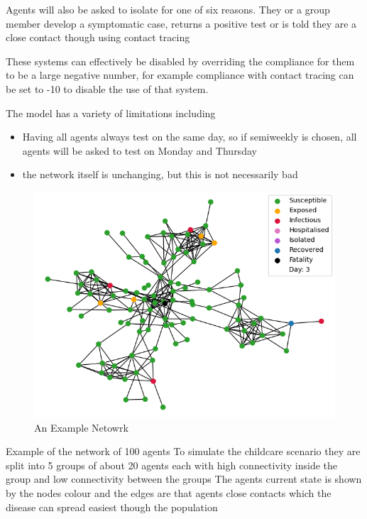 \documentclass{article}
\begin{document}
Agents will also be asked to isolate for one of six reasons. They or a group member develop a symptomatic case, returns a positive test or is told they are a close contact though using contact tracing

These systems can effectively be disabled by overriding the compliance for them to be a large negative number, for example compliance with contact tracing can be set to -10 to disable the use of that system.

The model has a variety of limitations including 
\begin{itemize}
\item Having all agents always test on the same day, so if semiweekly is chosen, all agents will be asked to test on Monday and Thursday
\item the network itself is unchanging, but this is not necessarily bad
\end{itemize}

\begin{figure}
  \centering
      \includegraphics[width=\textwidth]{network}
  \caption{An Example Netowrk}
\end{figure}


Example of the network of 100 agents
To simulate the childcare scenario they are split into 5 groups of about 20 agents each with high connectivity inside the group and low connectivity between the groups 
The agents current state is shown by the nodes colour and the edges are that agents close contacts which the disease can spread easiest though the population
\end{document}
